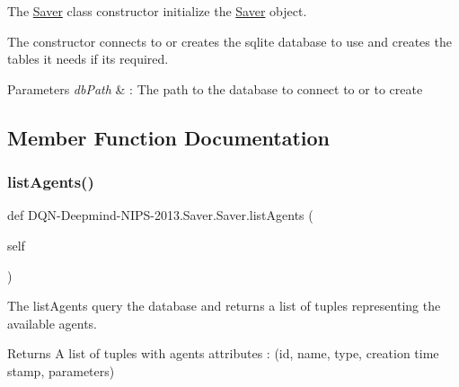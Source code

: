 The \hyperlink{classDQN-Deepmind-NIPS-2013_1_1Saver_1_1Saver}{Saver} class constructor initialize the \hyperlink{classDQN-Deepmind-NIPS-2013_1_1Saver_1_1Saver}{Saver} object. 

The constructor connects to or creates the sqlite database to use and creates the tables it needs if its required.


\begin{DoxyParams}{Parameters}
{\em db\+Path} & \+: The path to the database to connect to or to create \\
\hline
\end{DoxyParams}


\subsection{Member Function Documentation}
\hypertarget{classDQN-Deepmind-NIPS-2013_1_1Saver_1_1Saver_a4f61e8fbd52eef88616ef8e9ef0fab2b}{}\label{classDQN-Deepmind-NIPS-2013_1_1Saver_1_1Saver_a4f61e8fbd52eef88616ef8e9ef0fab2b} 
\subsubsection{\texorpdfstring{list\+Agents()}{listAgents()}}
{\footnotesize\ttfamily def D\+QN-\/Deepmind-\/N\+I\+PS-\/2013.Saver.\+Saver.\+list\+Agents (\begin{DoxyParamCaption}\item[{}]{self }\end{DoxyParamCaption})}



The list\+Agents query the database and returns a list of tuples representing the available agents. 

\begin{DoxyReturn}{Returns}
A list of tuples with agent\textquotesingle{}s attributes \+: (id, name, type, creation time stamp, parameters) 
\end{DoxyReturn}
\hypertarget{classDQN-Deepmind-NIPS-2013_1_1Saver_1_1Saver_a47c6eac5868ed0525a258211a4d75cd9}{}\label{classDQN-Deepmind-NIPS-2013_1_1Saver_1_1Saver_a47c6eac5868ed0525a258211a4d75cd9} 
